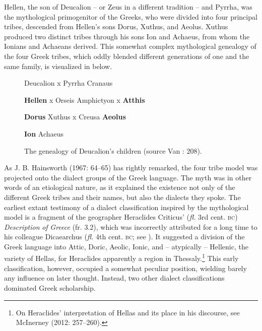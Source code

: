 Hellen, the son of Deucalion – or Zeus in a different tradition – and Pyrrha, was the mythological primogenitor of the Greeks, who were divided into four principal tribes, descended from Hellen’s sons Dorus, Xuthus, and Aeolus. Xuthus produced two distinct tribes through his sons Ion and Achaeus, from whom the Ionians and Achaeans derived. This somewhat complex mythological genealogy of the four Greek tribes, which oddly blended different generations of one and the same family, is visualized in  below.

\begin{figure}
\caption{The genealogy of Deucalion’s children (source Van \citealt{Rooy2016b}: 208).} 

Deucalion x Pyrrha        Cranaus


  \textbf{Hellen} x Orseis  Amphictyon  x  \textbf{Atthis}






\textbf{Dorus}  Xuthus x Creusa  \textbf{Aeolus}

\textbf{Ion}  Achaeus
\end{figure}

As J. B. Hainsworth (1967: 64–65) has rightly remarked, the four tribe model was projected onto the dialect groups of the Greek language. The myth was in other words of an etiological nature, as it explained the existence not only of the different Greek tribes and their names, but also the dialects they spoke. The earliest extant testimony of a dialect classification inspired by the mythological model is a fragment of the geographer Heraclides Criticus’ (\textit{fl.} 3rd cent. \textsc{bc}) \textit{Description} \textit{of} \textit{Greece} (fr. 3.2), which was incorrectly attributed for a long time to his colleague Dicaearchus (\textit{fl.} 4th cent. \textsc{bc}; see \citealt{Brodersen2015}). It suggested a division of the Greek language into Attic, Doric, Aeolic, Ionic, and – atypically – Hellenic, the variety of Hellas, for Heraclides apparently a region in Thessaly.\footnote{On Heraclides’ interpretation of Hellas and its place in his discourse, see McInerney (2012: 257–260).} This early classification, however, occupied a somewhat peculiar position, wielding barely any influence on later thought. Instead, two other dialect classifications dominated Greek scholarship.

